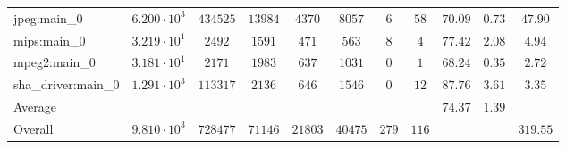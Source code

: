 \begin{tabular}{|l|c|c|c|c|c|c|c|c|c|c|}
jpeg:main\_0            & $ 6.200 \cdot 10^{3} $ & $ 434525 $ & $ 13984 $ & $ 4370  $ & $ 8057  $ & $ 6   $ & $ 58  $ & $ 70.09       $ & $ 0.73    $ & $ 47.90   $ \\
mips:main\_0            & $ 3.219 \cdot 10^{1} $ & $ 2492   $ & $ 1591  $ & $ 471   $ & $ 563   $ & $ 8   $ & $ 4   $ & $ 77.42       $ & $ 2.08    $ & $ 4.94    $ \\
mpeg2:main\_0           & $ 3.181 \cdot 10^{1} $ & $ 2171   $ & $ 1983  $ & $ 637   $ & $ 1031  $ & $ 0   $ & $ 1   $ & $ 68.24       $ & $ 0.35    $ & $ 2.72    $ \\
sha\_driver:main\_0     & $ 1.291 \cdot 10^{3} $ & $ 113317 $ & $ 2136  $ & $ 646   $ & $ 1546  $ & $ 0   $ & $ 12  $ & $ 87.76       $ & $ 3.61    $ & $ 3.35    $ \\
\hline
Average                 & $                    $ & $        $ & $       $ & $       $ & $       $ & $     $ & $     $ & $ 74.37       $ & $ 1.39    $ & $         $ \\
\hline
Overall                 & $ 9.810 \cdot 10^{3} $ & $ 728477 $ & $ 71146 $ & $ 21803 $ & $ 40475 $ & $ 279 $ & $ 116 $ & $             $ & $         $ & $ 319.55  $ \\
\hline
\end{tabular}
